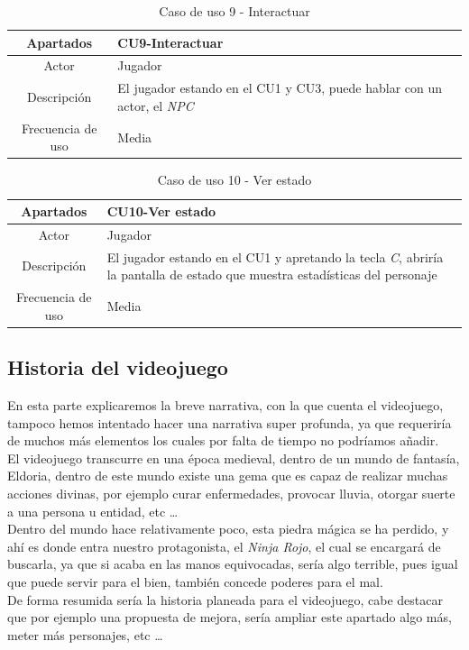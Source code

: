\documentclass[a4paper]{article}
\begin{document}
\begin{table}[ht]
    \centering
    \begin{tabular}{|c|p{12cm}|} 
        \hline
        \textbf{Apartados}       & \textbf{CU9-Interactuar} \\
        \hline
        Actor                    & Jugador \\
        \hline
        Descripción              & El jugador estando en el CU1 y CU3, puede hablar con un actor, el \textit{NPC} \\
        \hline
        Frecuencia de uso        & Media \\
        \hline
    \end{tabular}
    \caption{Caso de uso 9 - Interactuar}
    \label{tab:casosdeuso9-table}
\end{table}

\begin{table}[ht]
    \centering
    \begin{tabular}{|c|p{12cm}|} 
        \hline
        \textbf{Apartados}       & \textbf{CU10-Ver estado} \\
        \hline
        Actor                    & Jugador \\
        \hline
        Descripción              & El jugador estando en el CU1 y apretando la tecla \textit{C}, abriría la pantalla de estado que muestra estadísticas del personaje\\
        \hline
        Frecuencia de uso        & Media \\
        \hline
    \end{tabular}
    \caption{Caso de uso 10 - Ver estado}
    \label{tab:casosdeuso10-table}
\end{table}

\clearpage
\subsection{Historia del videojuego}
En esta parte explicaremos la breve narrativa, con la que cuenta el videojuego, tampoco hemos intentado hacer una narrativa super profunda, ya que requeriría de muchos más elementos
los cuales por falta de tiempo no podríamos añadir.\\
El videojuego transcurre en una época medieval, dentro de un mundo de fantasía, Eldoria, dentro de este mundo existe una gema que es capaz de realizar muchas acciones divinas, por ejemplo
curar enfermedades, provocar lluvia, otorgar suerte a una persona u entidad, etc \dots \\
Dentro del mundo hace relativamente poco, esta piedra mágica se ha perdido, y ahí es donde entra nuestro protagonista, el \textit{Ninja Rojo}, el cual se encargará de buscarla, ya que
si acaba en las manos equivocadas, sería algo terrible, pues igual que puede servir para el bien, también concede poderes para el mal.\\
De forma resumida sería la historia planeada para el videojuego, cabe destacar que por ejemplo una propuesta de mejora, sería ampliar este apartado algo más, meter más personajes, etc \dots
\end{document}
